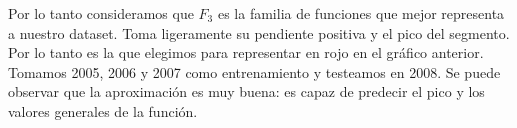 Por lo tanto consideramos que $F_3$ es la familia de funciones que mejor representa a nuestro dataset. Toma ligeramente su pendiente positiva y el pico del segmento. Por lo tanto es la que elegimos para representar en rojo en el gr\'afico anterior. Tomamos 2005, 2006 y 2007 como entrenamiento y testeamos en 2008. Se puede observar que la aproximaci\'on es muy buena: es capaz de predecir el pico y los valores generales de la funci\'on.	










